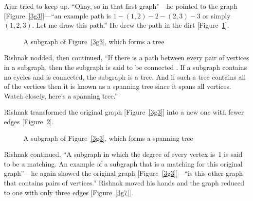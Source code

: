Ajur tried to keep up.  ``Okay, so in that first graph''---he pointed to the graph [Figure~\ref{3g3}]---``an example path is $1-(1,2)-2-(2,3)-3$ or simply $(1,2,3)$. Let me draw this path.'' He drew the path in the dirt [Figure~\ref{3g5}].

\begin{figure}
\begin{center}
\caption{A subgraph of Figure~\ref{3g3}, which forms a tree}\label{3g5}
\end{center}
\end{figure}

Rishnak nodded, then continued, ``If there is a path between every pair of vertices in a subgraph, then the subgraph is said to be connected . If a subgraph contains no cycles and is connected, the subgraph is a tree. And if such a tree contains all of the vertices then it is known as a spanning tree since it spans all vertices. Watch closely, here's a spanning tree.'' 

Rishnak transformed the original graph [Figure~\ref{3g3}] into a new one with fewer edges [Figure~\ref{3g6}].

\begin{figure}
\begin{center}
\caption{A subgraph of Figure~\ref{3g3}, which forms a spanning tree}\label{3g6}
\end{center}
\end{figure}

Rishnak continued, ``A subgraph in which the degree of every vertex is~1 is said to be a matching. An example of a subgraph that is a matching  for this original graph''---he again showed the original graph [Figure~\ref{3g3}]---``is this other graph that contains pairs of vertices.'' Rishnak moved his hands and the graph reduced to one with only three edges [Figure~\ref{3g7}].

